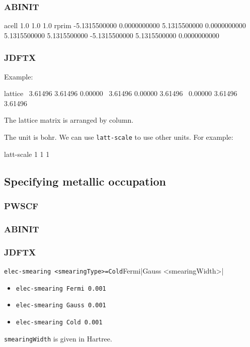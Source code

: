 

\subsubsection{ABINIT}

\begin{textcode}
acell 1.0 1.0 1.0
rprim
  -5.1315500000   0.0000000000   5.1315500000
   0.0000000000   5.1315500000   5.1315500000
  -5.1315500000   5.1315500000   0.0000000000
\end{textcode}


\subsubsection{JDFTX}

Example:

\begin{textcode}
lattice \
  3.61496   3.61496   0.00000 \
  3.61496   0.00000   3.61496 \
  0.00000   3.61496   3.61496 
\end{textcode}

The lattice matrix is arranged by column.

The unit is bohr. We can use \verb|latt-scale| to use other units. For example:
\begin{textcode}
latt-scale 1 1 1
\end{textcode}

\subsection{Specifying metallic occupation}

\subsubsection{PWSCF}



\subsubsection{ABINIT}




\subsubsection{JDFTX}

\verb|elec-smearing <smearingType>=Cold|Fermi|Gauss <smearingWidth>|

\begin{itemize}
\item \verb|elec-smearing Fermi 0.001|
\item \verb|elec-smearing Gauss 0.001|
\item \verb|elec-smearing Cold 0.001|
\end{itemize}

\verb|smearingWidth| is given in Hartree.
